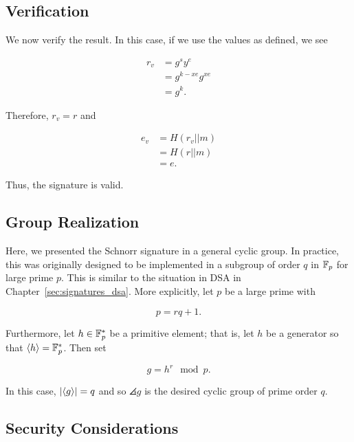 \subsection{Verification}

We now verify the result.
In this case, if we use the values as defined, we see

\begin{align}
    r_{v} &= g^{s}y^{e} \nonumber\\
        &= g^{k-xe}g^{xe} \nonumber\\
        &= g^{k}.
\end{align}

\noindent
Therefore, $r_{v} = r$ and

\begin{align}
    e_{v} &= H(r_{v}||m) \nonumber\\
        &= H(r||m) \nonumber\\
        &= e.
\end{align}

\noindent
Thus, the signature is valid.

\subsection{Group Realization}

Here, we presented the Schnorr signature in a general \gls{cyclic group}.
In practice, this was originally designed to be implemented
in a \gls{subgroup} of order $q$ in $\mathbb{F}_{p}$ for large prime $p$.
This is similar to the situation in DSA
in Chapter~\ref{sec:signatures_dsa}.
More explicitly, let $p$ be a large prime with

\begin{equation}
    p = rq + 1.
\end{equation}

\noindent
Furthermore, let $h\in\mathbb{F}_{p}^{*}$ be a primitive element;
that is, let $h$ be a generator so that $\left\langle h \right\rangle = \mathbb{F}_{p}^{*}$.
Then set

\begin{equation}
    g = h^{r} \mod p.
\end{equation}

\noindent
In this case, $\left| \left\langle g \right\rangle \right| = q$ and so $\angles{g}$
is the desired \gls{cyclic group} of prime order $q$.

\subsection{Security Considerations}
\label{sig:schnorr_security}

